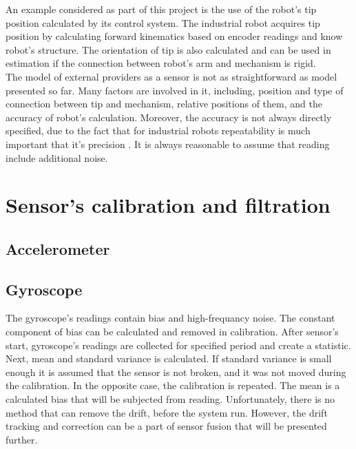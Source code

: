 An example considered as part of this project is the use of the robot's tip position calculated by its control system. The industrial robot acquires tip position by calculating forward kinematics based on encoder readings and know robot's structure. The orientation of tip is also calculated and can be used in estimation if the connection between robot's arm and mechanism is rigid.\\

The model of external providers as a sensor is not as straightforward as model presented so far. Many factors are involved in it, including, position and type of connection between tip and mechanism, relative positions of them, and the accuracy of robot's calculation. Moreover, the accuracy is not always directly specified, due to the fact that for industrial robots repeatability is much important that it's precision \cite{shiakolas2002accuracy}.
It is always reasonable to assume that reading include additional noise.

\section{Sensor's calibration and filtration}



\subsection{Accelerometer}


\subsection{Gyroscope}

The gyroscope's readings contain bias and high-frequancy noise. The constant component of bias can be calculated and removed in calibration. After sensor's start, gyroscope's readings are collected for specified period and create a statistic. Next, mean and standard variance is calculated. If standard variance is small enough it is assumed that the sensor is not broken, and it was not moved during the calibration. In the opposite case, the calibration is repeated. The mean is a calculated bias that will be subjected from reading.
Unfortunately, there is no method that can remove the drift, before the system run. However, the drift tracking and correction can be a part of sensor fusion that will be presented further.\\

